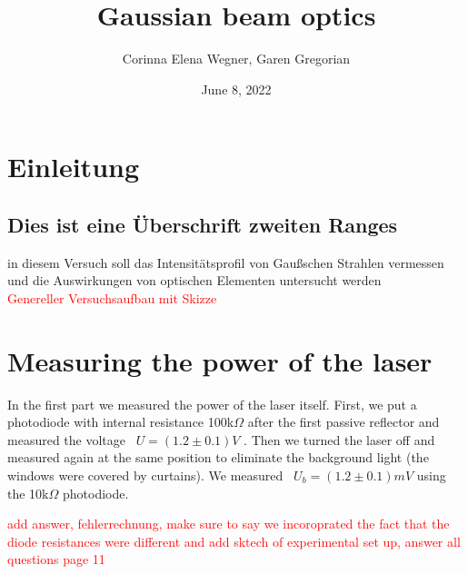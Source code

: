 \documentclass{article}
\begin{document}
 

\title{Gaussian beam optics}
\author{Corinna Elena Wegner, Garen Gregorian}
\date{June 8, 2022}
\maketitle %
\newpage
\tableofcontents
\newpage

\section{Einleitung} %
\subsection{Dies ist eine Überschrift zweiten Ranges}

in diesem Versuch soll das Intensitätsprofil von Gaußschen Strahlen vermessen und die Auswirkungen von optischen Elementen untersucht werden\\

\textcolor{red}{Genereller Versuchsaufbau mit Skizze}\\

\section{Measuring the power of the laser}

In the first part we measured the power of the laser itself. First, we put a photodiode with internal resistance 100k$\Omega$
after the first passive reflector and measured the voltage
\ $U=(1.2 \pm 0.1) V$ %
. Then we turned the laser off and measured again at the same position to eliminate the background light (the windows were covered by curtains). We measured 
\ $U_b = (1.2 \pm 0.1)mV$ 
using the 
10k$\Omega$
photodiode. 

\textcolor{red}{add answer, fehlerrechnung, make sure to say we incoroprated the fact that the diode resistances were different and add sktech of experimental set up, answer all questions page 11}
\end{document}
